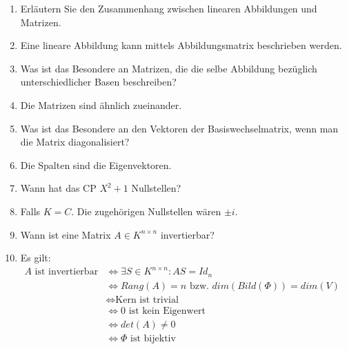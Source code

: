 \documentclass[11pt,parskip=full]{scrartcl}
\newcommand{\answer}{\item[\textbf{Antwort}]}
\begin{document}
\begin{enumerate}[label=\textbf{\arabic*. Frage}]
		\item Erläutern Sie den Zusammenhang zwischen linearen Abbildungen und Matrizen.
		\answer Eine lineare Abbildung kann mittels Abbildungsmatrix beschrieben werden.
		
		\item Was ist das Besondere an Matrizen, die die selbe Abbildung bezüglich unterschiedlicher Basen beschreiben?
		\answer Die Matrizen sind ähnlich zueinander.
		
		\item Was ist das Besondere an den Vektoren der Basiswechselmatrix, wenn man die Matrix diagonalisiert?
		\answer Die Spalten sind die Eigenvektoren.
		
		\item Wann hat das CP \(X^2 + 1\) Nullstellen?
		\answer Falls \(K = C\). Die zugehörigen Nullstellen wären $\pm i$.
		
		
		\item Wann ist eine Matrix \(A \in K^{n \times n}\) invertierbar?
		\answer Es gilt:\\
		\(\begin{aligned}A \text{ ist invertierbar} 
		&\iff \exists S \in K^{n \times n}: AS = Id_n\\
		&\iff Rang(A) = n \text{ bzw. } dim(Bild(\Phi)) = dim(V)\\
		&\iff \text{Kern ist trivial}\\
		&\iff 0 \text{ ist kein Eigenwert}\\
		&\iff det(A) \neq 0\\
		& \iff \Phi \text{ ist bijektiv}
		\end{aligned}\)
		
	\end{enumerate}
\end{document}
